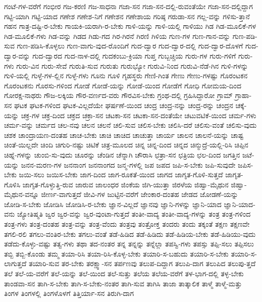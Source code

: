 {ಗಂಟೆ-ಗಳ-ವರೆಗೆ
ಗಂಭೀರ
ಗಜ-ಕರಣಿ
ಗಜ-ಸಾಧನಾ
ಗಜಾ-ಸನ
ಗಜಾ-ಸನ-ದಲ್ಲಿ-ರುವಂತೆಯೇ
ಗಜಾ-ಸನ-ದಲ್ಲಿದ್ದಾಗ
ಗಟ್ಟಿ-ಯಾಗಿ
ಗಟ್ಟಿ-ಯಾದ
ಗಣೇಶ
ಗಣೇಶ-ನಿಗೆ
ಗಣೇಶನ
ಗಣೇಶಾಯ
ಗರಿಷ್ಠ
ಗರುಡಾ-ಸನ
ಗಲ್ಲ-ವನ್ನು
ಗಳಿಸು-ತ್ತಾನೆ
ಗಹನ
ಗಾತ್ರ-ದಷ್ಟಿ-ರ-ಬೇಕು
ಗಾಯಕಿ-ಯರಾಗಿ-ರ-ಬೇಕು
ಗಾಳಿ-ಯನ್ನು
ಗಾಳಿ-ಯಲ್ಲಿ
ಗಾಳಿಯು
ಗಿಡ
ಗಿಡ-ಮೂಲಿಕೆ-ಗಳ
ಗಿಡ-ಮೂಲಿಕೆ-ಗಳು
ಗಿಡ-ವನ್ನು
ಗಿಡದ
ಗಿಡು-ಗದ
ಗಿರ-ಗಿರನೆ
ಗಿರಣಿ
ಗಿಳಿಯ
ಗುಣ-ಗಳ
ಗುಣ-ಗಾನ-ವನ್ನು
ಗುಣ-ಪಡಿ-ಸುವ
ಗುಣ-ಪಡಿಸಿ-ಕೊಳ್ಳಲು
ಗುಣ-ವಾಗು-ವುದ-ರೊಂದಿಗೆ
ಗುದ-ದ್ವಾರ
ಗುದ-ದ್ವಾರ-ದಲ್ಲಿ
ಗುದ-ದ್ವಾರ-ದೊಳಗೆ
ಗುದ-ದ್ವಾರ-ವನ್ನು
ಗುದ-ದ್ವಾರದ
ಗುದ-ನಾಳ-ದಲ್ಲಿ
ಗುದಕಂಬು-ಕ್ರಿಯಾ
ಗುಪ್ತ
ಗುಬ್ಬಚ್ಚಿಯ
ಗುರು-ಗಳ
ಗುರು-ಗಳಿಗೆ
ಗುರು-ಗಳು
ಗುರು-ವಿನ
ಗುರು-ಸೇವೆ
ಗುರುತಿ-ಸುವ
ಗುರುತು
ಗುರುಭ್ಯೋ
ಗುರುವಿ-ನಿಂದ
ಗುರುವಿ-ನೆಡೆ-ಗಿನ
ಗುಳಿ-ಗಳನ್ನು
ಗುಳಿ-ಯಲ್ಲಿ
ಗುಳ್ಳೆ-ಗಳ-ಲ್ಲಿನ
ಗುಳ್ಳೆ-ಗಳು
ಗೂನು
ಗೂಳಿ
ಗೃಹಸ್ಥರು
ಗೇಣಿ-ಗಿಂತ
ಗೇಣು
ಗೇಣು-ಗಳಷ್ಟು
ಗೊರಂಟಕನ
ಗೊರಂಟಕನು
ಗೊರಸು-ಗಳಿಂದ
ಗೋಡೆ
ಗೋಡೆ-ಯನ್ನು
ಗೋಡೆ-ಯಿಂದ
ಗೋಡೆಗೆ
ಗೋಧಿ
ಗೋಮಯ-ದಿಂದ
ಗೋರಕ್ಷ-ನಾಥರು
ಗೌಜ-ಲಕ್ಕಿಯ
ಗೌರ-ವರ್ಣದ-ವರು
ಗೌರವಿಸ-ಬೇಕು
ಗ್ರಂಥ-ದಲ್ಲಿ
ಗ್ರಹಿಸಿದ್ದಾರೋ
ಗ್ರಾಮ್
ಗ್ರಾಹಾ-ಸನ
ಘಟಕ
ಘಟಕ-ಗಳಿಂದ
ಘಟಕ-ವಿಲ್ಲದೆಯೇ
ಘರ್ಷಣೆ-ಯಿಂದ
ಚಂದ್ರ
ಚಂದ್ರ-ನನ್ನು
ಚಂದ್ರ-ರನ್ನು
ಚಂದ್ರನ
ಚಕ್ಕೆ-ಯನ್ನು
ಚಕ್ರ-ಗಳ
ಚಕ್ರ-ದಿಂದ
ಚಕ್ರದ
ಚಕ್ರಾ-ಸನ
ಚಟಕಾ-ಸನ
ಚಟಕಾ-ಸನ-ದಂತೆಯೇ
ಚಟುವಟಿಕೆ-ಯಿಂದ
ಚರ್ಮ-ಗಳು
ಚರ್ಮ-ವನ್ನು
ಚರ್ಮದ
ಚಲ-ನವು
ಚಲನ
ಚಲನೆ
ಚಲಿ-ಸುವ
ಚಲಿಸ-ಬೇಕು
ಚಲಿಸಿ-ದರೆ
ಚಲಿಸು-ವಂತೆ
ಚಲಿಸು-ವುದು
ಚಶಕ
ಚಾಂದ್ರಾಯಣ-ದಂತಹ
ಚಾಚ-ಬೇಕು
ಚಾಚಿ
ಚಾಚಿದ
ಚಾಚುತ್ತಾ
ಚಾರ್ಯ
ಚಾಲನ
ಚಾಲನೆ-ಯನ್ನು
ಚಾಷ್ಟ
ಚಿಂತೆ-ಯಿಲ್ಲದೇ
ಚಿಂದಿ
ಚಿಗುರಿ-ನಷ್ಟು
ಚಿಟಿಕೆ
ಚಿತ್ರ-ಮೂಲದ
ಚಿನ್ನ
ಚಿನ್ನ-ದಿಂದ
ಚಿನ್ನದ
ಚಿನ್ಮುದ್ರೆ-ಯಲ್ಲಿ-ರಿಸಿ
ಚಿಪ್ಪಿನ
ಚಿಹ್ನೆ-ಗಳನ್ನು
ಚುಂಬಿ-ಸು-ವುದು
ಚೂರನ್ನು
ಚೆಂಡಿನ
ಚೆನ್ನಾಗಿ
ಚೌರಾಸಿ
ಛತ್ರಾ-ಸನ
ಛತ್ರಿಯ
ಛಲ-ದಿಂದ
ಜಗತ್ತಿನ
ಜಟೆ-ಯನ್ನು
ಜನನ-ಮರಣ-ಗಳ
ಜನನಾಂಗ
ಜನನಾಂಗದ
ಜನ್ಮ-ಗಳಲ್ಲಿ
ಜಪ
ಜಪದ
ಜಪಿ-ಸ-ಬೇಕು
ಜಪಿ-ಸುವುದೇ
ಜಪಿಸ-ಬೇಕು
ಜಯಿ-ಸಲು
ಜಯಿಸ-ಬೇಕು
ಜಾಗ-ದಿಂದ
ಜಾಗ-ರೂಕತೆ-ಯಿಂದ
ಜಾಗದ
ಜಾಗೃತ-ಗೊಳಿ-ಸುತ್ತದೆ
ಜಾಗೃತ-ಗೊಳಿಸಿ
ಜಾಗೃತ-ಗೊಳ್ಳುತ್ತಿ-ರುವ
ಜಾರುವ
ಜಾಲಂಧರ
ಜಿಂಕೆಯ
ಜಿಗಿ-ಯುತ್ತಾ
ಜಿರಳೆಯ
ಜಿಹ್ವಾ-ಮೈಥುನ
ಜಿಹ್ವಾ-ಮೈಥುನ-ವನ್ನೂ
ಜೀರ್ಣ-ವಾಗುತ್ತದೆ
ಜೀವಿ-ಗಳ
ಜುಟ್ಟಿನ-ವರೆಗೆ
ಜೇಂಕಾರ-ದಂತಹ
ಜೇಡದ
ಜೋಡಣೆ-ಯನ್ನು
ಜೋಡಿ-ಸ-ಬೇಕು
ಜೋಡಿಸಿ
ಜೋಡಿಸಿ-ರ-ಬೇಕು
ಜ್ಞಾನ-ವಿಲ್ಲದೆ
ಜ್ಞಾನವು
ಜ್ಞಾನಿ-ಗಳನ್ನು
ಜ್ಞಾನಿ-ಯಾದ
ಜ್ಞಾನಿ-ಯಾದ-ವನು
ಜ್ಯೋತಿಷ್ಮತಿ
ಜ್ವರ
ಜ್ವರ-ವನ್ನು
ಜ್ವರ-ವುಂಟಾ-ಗುತ್ತದೆ
ತಂತೀ-ವಾದ್ಯ
ತಂತೀ-ವಾದ್ಯ-ಗಳನ್ನು
ತಂತ್ರ
ತಂತ್ರ-ಗಳಿಂದ
ತಂತ್ರ-ಗಳು
ತಂತ್ರ-ದಂತಹ
ತಂತ್ರ-ವನ್ನು
ತಂತ್ರ-ವೆಂದು
ತಂತ್ರವು
ತಂತ್ರೋಕ್ತ
ತಂದರು
ತಂದು
ತಕ್ಕಂತೆ
ತಕ್ಷಣ
ತಕ್ಷಣವೇ
ತಗಲಿ-ರಲಿ
ತಗಲು-ವಂತಿರ-ಬೇಕು
ತಗಲು-ವಂತೆ
ತಡೆ-ಹಿಡಿದ
ತಡೆ-ಹಿಡಿದು
ತಡೆ-ಹಿಡಿಯ-ಬೇಕು
ತಡೆ-ಹಿಡಿಯು-ವುದು
ತಡೆದು-ಕೊಳ್ಳು-ವಷ್ಟು
ತತ್ವ-ಗಳು
ತಥಾ
ತದ-ನಂತರ
ತನ್ನ
ತನ್ನನ್ನು
ತನ್ನೆಲ್ಲಾ
ತಪಸ್ವಿ-ಗಳು
ತಪಸ್ಸು
ತಪ್ಪಿ-ಸಲು
ತಪ್ಪಿಸಲು
ತಬ್ಬಿ
ತಬ್ಬಿ-ಕೊಂಡು
ತಮ್ಮ
ತಯಾ-ರಿಸಿ
ತಯಾ-ರಿಸಿ-ಕೊಳ್ಳ-ಬೇಕು
ತಯಾರಿ-ಸ-ಬಹುದು
ತಯಾರಿ-ಸ-ಬೇಕು
ತಯಾರಿ-ಸ-ಲಾಗುತ್ತದೆ
ತಯಾರಿ-ಸುವ
ತರ-ಬೇಕು
ತರಕ್ಷ್ವಾ-ಸನ
ತರ್ಪಣವು
ತಲುಪ-ದಿದ್ದಾಗ
ತಲುಪಿ-ದಾಗ
ತಲುಪಿದ
ತಲುಪು-ತ್ತದೆ
ತಲೆ
ತಲೆ-ಯ-ವರೆಗೆ
ತಲೆ-ಯನ್ನು
ತಲೆ-ಯಿಂದ
ತಲೆ-ಸುತ್ತು
ತಲೆಯ
ತಲೆಯ-ವರೆಗೆ
ತಳ-ಭಾಗ-ದಲ್ಲಿ
ತಳ್ಳ-ಬೇಕು
ತಾಂಡವಾ-ಸನ
ತಾಗಿ-ಸ-ಬೇಕು
ತಾಗಿ-ಸ-ಬೇಕು-ನಂತರ
ತಾಗಿ-ಸುವ
ತಾಗಿಸಿ
ತಾಜಾ
ತಾತ್ಕಾಲಿಕ
ತಾಳ್ಮೆ
ತಾಳ್ಮೆ-ಮತ್ತು
ತಿಂಗಳ
ತಿಂಗಳಲ್ಲಿ
ತಿಂಗಳೊಳಗೆ
ತಿತ್ತಿರ್ಯಾ-ಸನ
ತಿರುಗಿ-ದಾಗ
}
